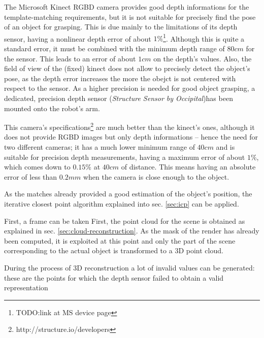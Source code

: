 The Microsoft Kinect RGBD camera provides good depth informations for the template-matching
requirements, but it is not suitable for precisely find the pose of an object
for grasping. This is due mainly to the limitations of its depth sensor, having
a nonlinear depth error of about $1\%$\footnote{TODO:link at MS device page}.
Although this is quite a standard error, it must be combined with the minimum
depth range of $80\unit{cm}$ for the sensor. This leads to an error of about
$1\unit{cm}$ on the depth's values. Also, the field of view of the (fixed)
kinect does not allow to precisely detect the object's pose, as the depth error
increases the more the obejct is not centered with respect to the sensor. As a
higher precision is needed for good 
object grasping, a dedicated, precision depth sensor (\emph{Structure Sensor by
Occipital})has been mounted onto the robot's arm.


This camera's specifications\footnote{http://structure.io/developers} are much better than the kinect's ones, although it
does not provide RGBD images but only depth informations -- hence the need for two
different cameras; it has a much lower minimum range of $40\unit{cm}$ and is suitable for
precision depth measurements, having a maximum error of about $1\%$, which comes
down to $0.15\%$ at $40\unit{cm}$ of distance. This means having an absolute
error of less than $0.2\unit{mm}$ when the camera is close enough to the object.

As the matches already provided a good estimation of the object's position, the
iterative closest point algorithm explained into sec. \ref{sec:icp} can be
applied. 

First, a frame can be taken
First, the point cloud %
for the scene is obtained as explained in sec. \ref{sec:cloud-reconstruction}.
As the mask of the render has already been computed, it is exploited at this
point and only the part of the scene corresponding to the actual object is
transformed to a 3D point cloud.

During the process of 3D reconstruction a lot of invalid values can be
generated: these are the points for which the depth sensor failed to obtain a
valid representation
